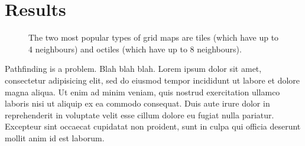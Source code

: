 \section{Results}
 \begin{figure}[t]
	\centering
	\caption{The two most popular types of grid maps are tiles (which have
up to 4 neighbours) and octiles (which have up to 8 neighbours).}
\vspace{1em}
 \end{figure}

Pathfinding is a problem. Blah blah blah.
Lorem ipsum dolor sit amet, consectetur adipisicing elit, sed do eiusmod
tempor incididunt ut labore et dolore magna aliqua. Ut enim ad minim
veniam, quis nostrud exercitation ullamco laboris nisi ut aliquip ex ea
commodo consequat. Duis aute irure dolor in reprehenderit in voluptate
velit esse cillum dolore eu fugiat nulla pariatur. Excepteur sint occaecat
cupidatat non proident, sunt in culpa qui officia deserunt mollit anim
id est laborum.


